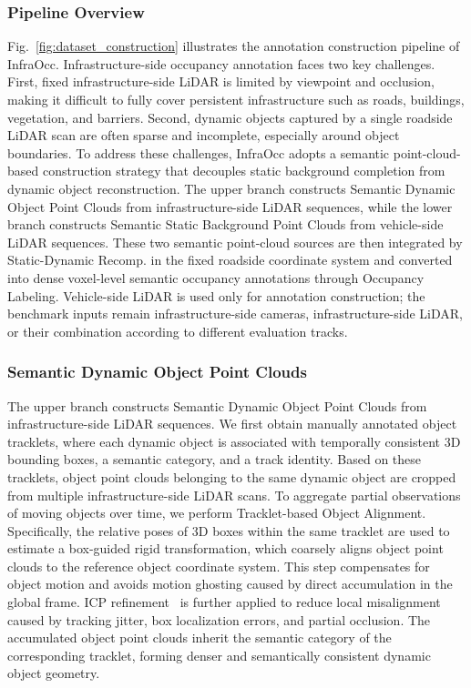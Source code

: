 \subsubsection{Pipeline Overview}
Fig.~\ref{fig:dataset_construction} illustrates the annotation construction
pipeline of InfraOcc. Infrastructure-side occupancy annotation faces two key
challenges. First, fixed infrastructure-side LiDAR is limited by viewpoint and
occlusion, making it difficult to fully cover persistent infrastructure such as
roads, buildings, vegetation, and barriers. Second, dynamic objects captured by
a single roadside LiDAR scan are often sparse and incomplete, especially around
object boundaries. To address these challenges, InfraOcc adopts a semantic
point-cloud-based construction strategy that decouples static background
completion from dynamic object reconstruction. The upper branch constructs
Semantic Dynamic Object Point Clouds from infrastructure-side LiDAR sequences,
while the lower branch constructs Semantic Static Background Point Clouds from
vehicle-side LiDAR sequences. These two semantic point-cloud sources are then
integrated by Static-Dynamic Recomp. in the fixed roadside coordinate system
and converted into dense voxel-level semantic occupancy annotations through
Occupancy Labeling. Vehicle-side LiDAR is used only for annotation
construction; the benchmark inputs remain infrastructure-side cameras,
infrastructure-side LiDAR, or their combination according to different
evaluation tracks.

\subsubsection{Semantic Dynamic Object Point Clouds}
The upper branch constructs Semantic Dynamic Object Point Clouds from
infrastructure-side LiDAR sequences. We first obtain manually annotated object
tracklets, where each dynamic object is associated with temporally consistent
3D bounding boxes, a semantic category, and a track identity. Based on these
tracklets, object point clouds belonging to the same dynamic object are cropped
from multiple infrastructure-side LiDAR scans.
To aggregate partial observations of moving objects over time, we perform
Tracklet-based Object Alignment. Specifically, the relative poses of 3D boxes
within the same tracklet are used to estimate a box-guided rigid
transformation, which coarsely aligns object point clouds to the reference
object coordinate system. This step compensates for object motion and avoids
motion ghosting caused by direct accumulation in the global frame. ICP
refinement~\cite{Besl1992ICP} is further applied to reduce local misalignment
caused by tracking jitter, box localization errors, and partial occlusion. The accumulated object
point clouds inherit the semantic category of the corresponding tracklet,
forming denser and semantically consistent dynamic object geometry.

